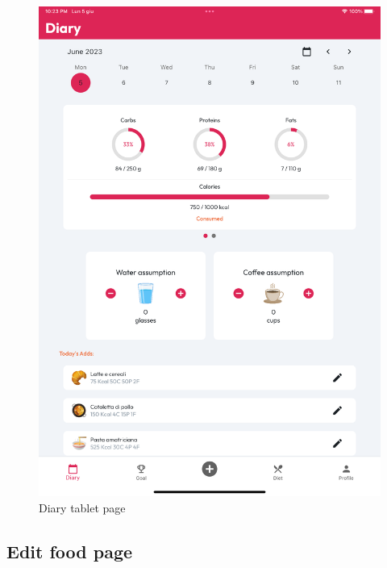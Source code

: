 \documentclass{Configuration_Files/PoliMi3i_thesis}
\begin{document}
\begin{figure}[!h]
  \includegraphics[scale=0.1]{Images/Screenshots/Tablet/DiaryTabletLight.png}
  \caption{Diary tablet page}
\end{figure}

\clearpage

\subsection{Edit food page}
\end{document}
